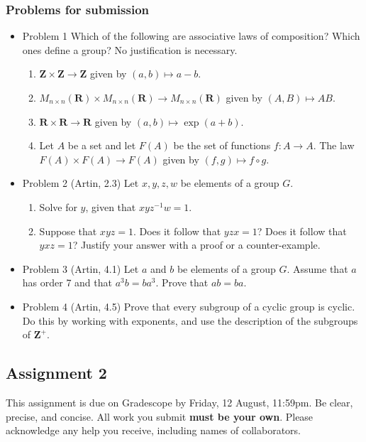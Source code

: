 \documentclass[11pt]{article}
\begin{document}
\subsubsection*{Problems for submission}
\label{sec:org7b20e06}
\begin{itemize}
\item Problem 1
\label{sec:org87f3c79}
Which of the following are associative laws of composition?  Which ones define a group?
   No justification is necessary.
\begin{enumerate}
\item \(\mathbf{Z} \times \mathbf{Z} \to \mathbf{Z}\) given by \((a, b) \mapsto a-b\).
\item \(M_{n\times n} (\mathbf{R}) \times M_{n \times n}(\mathbf{R}) \to M_{n \times n}(\mathbf{R})\) given by \((A,B) \mapsto AB\).
\item \(\mathbf{R} \times \mathbf{R} \to \mathbf{R}\) given by \((a,b) \mapsto \exp(a+b)\).
\item Let \(A\) be a set and let \(F(A)\) be the set of functions \(f \colon A \to A\).
The law \(F(A) \times F(A) \to F(A)\) given by \((f,g) \mapsto f \circ g\).
\end{enumerate}
\item Problem 2
\label{sec:orgd9b64e7}
(Artin, 2.3) Let \(x,y,z,w\) be elements of a group \(G\).
\begin{enumerate}
\item Solve for \(y\), given that \(xyz^{-1}w = 1\).
\item Suppose that \(xyz = 1\).  Does it follow that \(yzx = 1\)?  Does it follow that \(yxz = 1\)?
Justify your answer with a proof or a counter-example.
\end{enumerate}
\item Problem 3
\label{sec:org217071e}
(Artin, 4.1) Let \(a\) and \(b\) be elements of a group \(G\).
   Assume that \(a\) has order 7 and that \(a^{3}b = ba^3.\)
   Prove that \(ab = ba\).
\item Problem 4
\label{sec:org2cb424f}
(Artin, 4.5) Prove that every subgroup of a cyclic group is cyclic.
Do this by working with exponents, and use the description of the subgroups of \(\mathbf{Z}^{+}\).
\end{itemize}
\subsection{Assignment 2}
\label{sec:orgf483b17}
This assignment is due on Gradescope by Friday, 12 August, 11:59pm.
Be clear, precise, and concise.  All work you submit \textbf{must be your own}.  Please acknowledge any help you receive, including names of collaborators.
\end{document}
